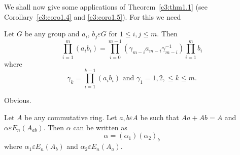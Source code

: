 We shall now give some applications of Theorem~\ref{c3:thm1.1} (see
Corollary~\ref{c3:coro1.4} and \ref{c3:coro1.5}). For this we need 

\begin{lem}\label{c3:lem1.2}
Let $G$ be any group and $a_i$, $b_j \varepsilon G$ for $1\leq i,j\leq
m$. Then  
$$
\prod\limits_{i=1}^{m}(a_ib_i)=\prod\limits_{i=0}^{m-1}\left(\gamma_{m-i}a_{m-i}\gamma^{-1}_{m-i}\right)
\prod\limits_{i=1}^{m} b_i
$$
where 
$$
\gamma_k=\prod\limits_{i=1}^{k-1}(a_ib_i) \text{ and }
\gamma_1=1,2,\leq k\leq m.
$$
\end{lem}

\begin{Proof}
Obvious.
\enprf
\end{Proof}

\begin{lem}\label{c3:lem1.3}
Let $A$ be any commutative ring. Let $a,b \varepsilon A$ be such that
$Aa+Ab=A$ and $\alpha \varepsilon E_n(A_{ab})$. Then $\alpha$ can be
written as 
$$
\alpha=(\alpha_1)(\alpha_2)_b
$$
where $\alpha_1\varepsilon E_n(A_b)$ and $\alpha_2 \varepsilon E_n(A_a)$.
\end{lem}

